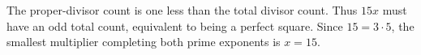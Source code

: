The proper-divisor count is one less than the total divisor count. Thus $15x$ must have an odd total count, equivalent to being a perfect square. Since $15=3\cdot5$, the smallest multiplier completing both prime exponents is $\boxed{x=15}$.
